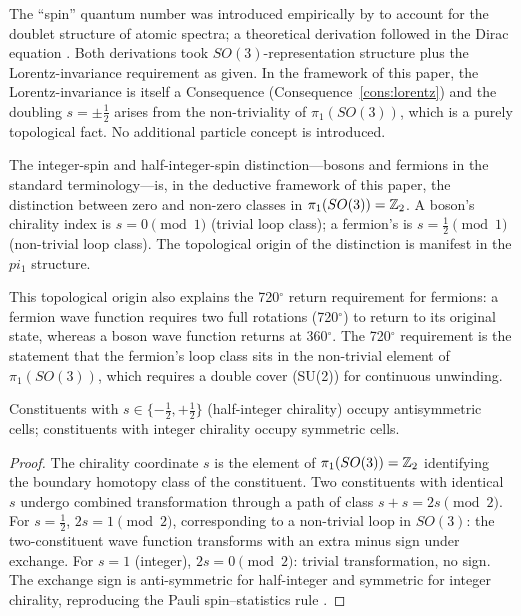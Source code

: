 \begin{remark}
The ``spin'' quantum number was introduced empirically by \citet{uhlenbeckgoudsmit1925} to account for the doublet structure of atomic spectra; a theoretical derivation followed in the Dirac equation \citep{dirac1928}. Both derivations took $SO(3)$-representation structure plus the Lorentz-invariance requirement as given. In the framework of this paper, the Lorentz-invariance is itself a Consequence (Consequence~\ref{cons:lorentz}) and the doubling $s=\pm\tfrac{1}{2}$ arises from the non-triviality of $\pi_{1}(SO(3))$, which is a purely topological fact. No additional particle concept is introduced.
\end{remark}

\begin{remark}
The integer-spin and half-integer-spin distinction---bosons and fermions in the standard terminology---is, in the deductive framework of this paper, the distinction between zero and non-zero classes in $\pi_{1}(SO(3))=\mathbb{Z}_{2}$. A boson's chirality index is $s=0\pmod 1$ (trivial loop class); a fermion's is $s=\tfrac{1}{2}\pmod 1$ (non-trivial loop class). The topological origin of the distinction is manifest in the $pi_{1}$ structure.

This topological origin also explains the 720$^{\circ}$ return requirement for fermions: a fermion wave function requires two full rotations (720$^{\circ}$) to return to its original state, whereas a boson wave function returns at 360$^{\circ}$. The 720$^{\circ}$ requirement is the statement that the fermion's loop class sits in the non-trivial element of $\pi_{1}(SO(3))$, which requires a double cover (SU(2)) for continuous unwinding.
\end{remark}

\begin{proposition}
\label{prop:spinstatistics}
Constituents with $s\in\{-\tfrac{1}{2},+\tfrac{1}{2}\}$ (half-integer chirality) occupy antisymmetric cells; constituents with integer chirality occupy symmetric cells.
\end{proposition}

\begin{proof}
The chirality coordinate $s$ is the element of $\pi_{1}(SO(3))=\mathbb{Z}_{2}$ identifying the boundary homotopy class of the constituent. Two constituents with identical $s$ undergo combined transformation through a path of class $s+s=2s\pmod 2$. For $s=\tfrac{1}{2}$, $2s=1\pmod 2$, corresponding to a non-trivial loop in $SO(3)$: the two-constituent wave function transforms with an extra minus sign under exchange. For $s=1$ (integer), $2s=0\pmod 2$: trivial transformation, no sign. The exchange sign is anti-symmetric for half-integer and symmetric for integer chirality, reproducing the Pauli spin--statistics rule \citep{pauli1925}.
\end{proof}

